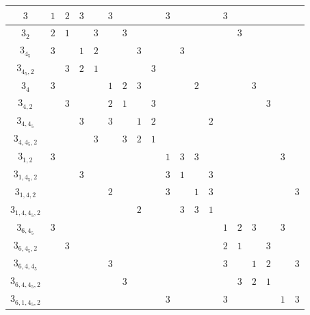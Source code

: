 \documentclass{amsart}
\theoremstyle{definition}
\theoremstyle{remark}
\begin{document}
\begin{table}
\begin{tabular}{|c||c|c|c|c|c|c|c|c|c|c|c|c|c|c|c|c|c|c|}
\hhline{|=#=|=|=|=|=|=|=|=|=|=|=|=|=|=|=|=|=|=|}
$3$ & $1$ & $2$ & $3$ &  & $3$ &  &  &  & $3$ &  &  &  & $3$ &  &  &  &  & \\ \hline
$3_2$ & $2$ & $1$ &  & $3$ &  & $3$ &  &  &  &  &  &  &  & $3$ &  &  &  & \\ \hline
$3_{4_5}$ & $3$ &  & $1$ & $2$ &  &  & $3$ &  &  & $3$ &  &  &  &  &  &  &  & \\ \hline
$3_{4_5,2}$ &  & $3$ & $2$ & $1$ &  &  &  & $3$ &  &  &  &  &  &  &  &  &  & \\ \hline
$3_4$ & $3$ &  &  &  & $1$ & $2$ & $3$ &  &  &  & $2$ &  &  &  & $3$ &  &  & \\ \hline
$3_{4,2}$ &  & $3$ &  &  & $2$ & $1$ &  & $3$ &  &  &  &  &  &  &  & $3$ &  & \\ \hline
$3_{4,4_5}$ &  &  & $3$ &  & $3$ &  & $1$ & $2$ &  &  &  & $2$ &  &  &  &  &  & \\ \hline
$3_{4,4_5,2}$ &  &  &  & $3$ &  & $3$ & $2$ & $1$ &  &  &  &  &  &  &  &  &  & \\ \hline
$3_{1,2}$ & $3$ &  &  &  &  &  &  &  & $1$ & $3$ & $3$ &  &  &  &  &  & $3$ & \\ \hline
$3_{1,4_5,2}$ &  &  & $3$ &  &  &  &  &  & $3$ & $1$ &  & $3$ &  &  &  &  &  & \\ \hline
$3_{1,4,2}$ &  &  &  &  & $2$ &  &  &  & $3$ &  & $1$ & $3$ &  &  &  &  &  & $3$\\ \hline
$3_{1,4,4_5,2}$ &  &  &  &  &  &  & $2$ &  &  & $3$ & $3$ & $1$ &  &  &  &  &  & \\ \hline
$3_{6,4_5}$ & $3$ &  &  &  &  &  &  &  &  &  &  &  & $1$ & $2$ & $3$ &  & $3$ & \\ \hline
$3_{6,4_5,2}$ &  & $3$ &  &  &  &  &  &  &  &  &  &  & $2$ & $1$ &  & $3$ &  & \\ \hline
$3_{6,4,4_5}$ &  &  &  &  & $3$ &  &  &  &  &  &  &  & $3$ &  & $1$ & $2$ &  & $3$\\ \hline
$3_{6,4,4_5,2}$ &  &  &  &  &  & $3$ &  &  &  &  &  &  &  & $3$ & $2$ & $1$ &  & \\ \hline
$3_{6,1,4_5,2}$ &  &  &  &  &  &  &  &  & $3$ &  &  &  & $3$ &  &  &  & $1$ & $3$\\ \hline

\end{tabular}
\end{table}
\end{document}
